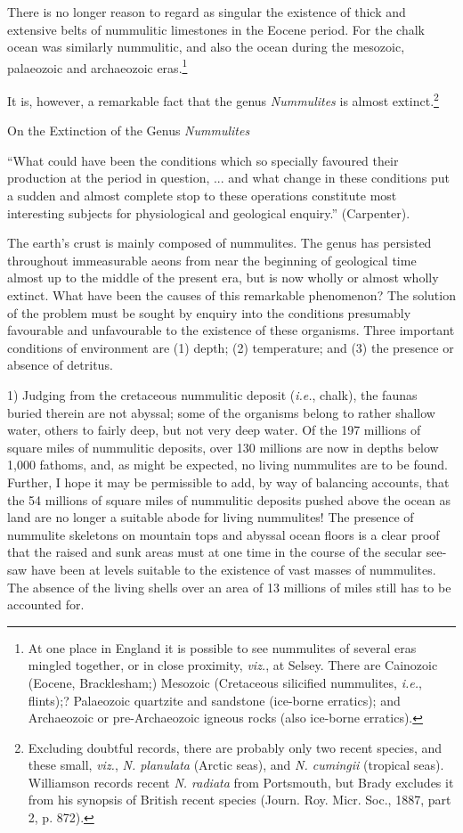 \documentclass[a4paper, 12pt, oneside]{article}
\begin{document}
There is no longer reason to regard as singular the existence of thick and extensive belts of nummulitic limestones in the Eocene period. For the chalk ocean was similarly nummulitic, and also the ocean during the mesozoic, palaeozoic and archaeozoic eras.\footnote{At one place in England it is possible to see nummulites of several eras mingled together, or in close proximity, \emph{viz.}, at Selsey. There are Cainozoic (Eocene, Bracklesham;) Mesozoic (Cretaceous silicified nummulites, \emph{i.e.}, flints);? Palaeozoic quartzite and sandstone (ice-borne erratics); and Archaeozoic or pre-Archaeozoic igneous rocks (also ice-borne erratics).}

It is, however, a remarkable fact that the genus \emph{Nummulites} is almost extinct.\footnote{Excluding doubtful records, there are probably only two recent species, and these small, \emph{viz.}, \emph{N. planulata} (Arctic seas), and \emph{N. cumingii} (tropical seas). Williamson records recent \emph{N. radiata} from Portsmouth, but Brady excludes it from his synopsis of British recent species (Journ. Roy. Micr. Soc., 1887, part 2, p. 872).}

On the Extinction of the Genus \emph{Nummulites}

``What could have been the conditions which so specially favoured their production at the period in question, ... and what change in these conditions put a sudden and almost complete stop to these operations constitute most interesting subjects for physiological and geological enquiry.'' (Carpenter).

The earth's crust is mainly composed of nummulites. The genus has persisted throughout immeasurable aeons from near the beginning of geological time almost up to the middle of the present era, but is now wholly or almost wholly extinct. What have been the causes of this remarkable phenomenon? The solution of the problem must be sought by enquiry into the conditions presumably favourable and unfavourable to the existence of these organisms. Three important conditions of environment are (1) depth; (2) temperature; and (3) the presence or absence of detritus.

1) Judging from the cretaceous nummulitic deposit (\emph{i.e.}, chalk), the faunas buried therein are not abyssal; some of the organisms belong to rather shallow water, others to fairly deep, but not very deep water. Of the 197 millions of square miles of nummulitic deposits, over 130 millions are now in depths below 1,000 fathoms, and, as might be expected, no living nummulites are to be found. Further, I hope it may be permissible to add, by way of balancing accounts, that the 54 millions of square miles of nummulitic deposits pushed above the ocean as land are no longer a suitable abode for living nummulites! The presence of nummulite skeletons on mountain tops and abyssal ocean floors is a clear proof that the raised and sunk areas must at one time in the course of the secular see-saw have been at levels suitable to the existence of vast masses of nummulites. The absence of the living shells over an area of 13 millions of miles still has to be accounted for.
\end{document}
